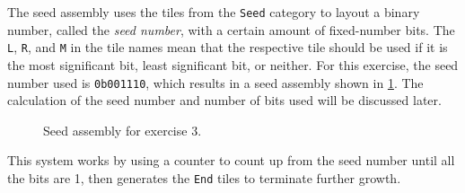 \documentclass[11pt]{article}
\begin{document}
The seed assembly uses the tiles from the \verb|Seed| category to layout a binary number, called the
\textit{seed number}, with a certain amount of fixed-number bits. The \verb|L|, \verb|R|, and
\verb|M| in the tile names mean that the respective tile should be used if it is the most
significant bit, least significant bit, or neither. For this exercise, the seed number used is
\verb|0b001110|, which results in a seed assembly shown in \cref{fig:exs-3_seed-assembly}. The
calculation of the seed number and number of bits used will be discussed later.

\begin{figure}[!ht]
    \centering
    \caption{Seed assembly for exercise 3.}
    \label{fig:exs-3_seed-assembly}
\end{figure}


This system works by using a counter to count up from the seed number until all the bits are 1, then
generates the \verb|End| tiles to terminate further growth. 
\end{document}
